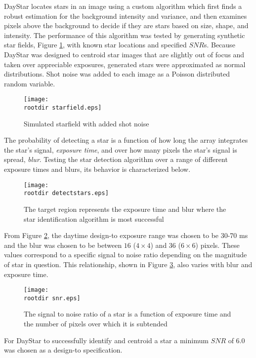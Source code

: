\documentclass[twocolumn,letterpaper]{IEEEAerospace2012}
\newcommand{\rootdir}{./Figures/}
\newcommand{\SNR}{\mathit{SNR}}
\begin{document}
DayStar locates stars in an image using a custom algorithm which first finds a robust estimation for the background intensity and variance, and then examines pixels above the background to decide if they are stars based on size, shape, and intensity. The performance of this algorithm was tested by generating synthetic star fields, Figure \ref{fig:starfield}, with known star locations and specified $\SNR$s. Because DayStar was designed to centroid star images that are slightly out of focus and taken over appreciable exposures, generated stars were approximated as normal distributions. Shot noise was added to each image as a Poisson distributed random variable.
\begin{figure}
    \centering
    \texttt{[image: \\rootdir starfield.eps]}
    \caption{Simulated starfield with added shot noise}
    \label{fig:starfield}
\end{figure}
The probability of detecting a star is a function of how long the array integrates the star's signal, \textit{exposure time}, and over how many pixels the star's signal is spread, \textit{blur}. Testing the star detection algorithm over a range of different exposure times and blurs, its behavior is characterized below.
\begin{figure}[H]
    \centering
    \texttt{[image: \\rootdir detectstars.eps]}
    \caption{The target region represents the exposure time and blur where the star identification algorithm is most successful}
    \label{fig:detectstars}
\end{figure}
From Figure \ref{fig:detectstars}, the daytime design-to exposure range was chosen to be 30-70 ms and the blur was chosen to be between $16$ ($4 \times 4$) and $36$ ($6 \times 6$) pixels. These values correspond to a specific signal to noise ratio depending on the magnitude of star in question. This relationship, shown in Figure \ref{fig:snr}, also varies with blur and exposure time.
\begin{figure}
    \centering
    \texttt{[image: \\rootdir snr.eps]}
    \caption{The signal to noise ratio of a star is a function of exposure time and the number of pixels over which it is subtended}
    \label{fig:snr}
\end{figure}
For DayStar to successfully identify and centroid a star a minimum $\SNR$ of 6.0 was chosen as a design-to specification.
\end{document}
